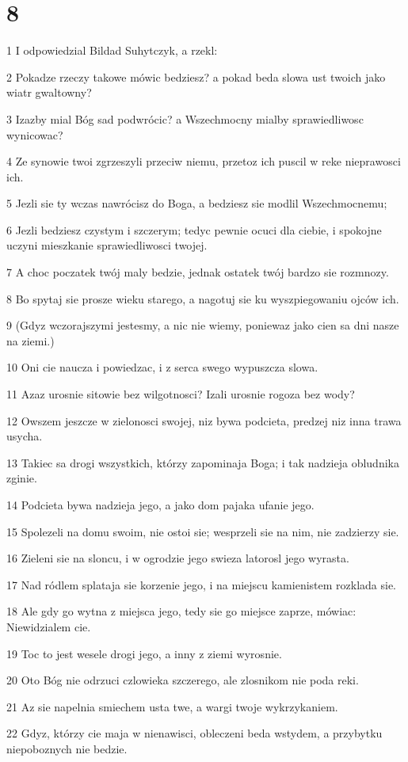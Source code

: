 \chapter{8}

\par 1 I odpowiedzial Bildad Suhytczyk, a rzekl:
\par 2 Pokadze rzeczy takowe mówic bedziesz? a pokad beda slowa ust twoich jako wiatr gwaltowny?
\par 3 Izazby mial Bóg sad podwrócic? a Wszechmocny mialby sprawiedliwosc wynicowac?
\par 4 Ze synowie twoi zgrzeszyli przeciw niemu, przetoz ich puscil w reke nieprawosci ich.
\par 5 Jezli sie ty wczas nawrócisz do Boga, a bedziesz sie modlil Wszechmocnemu;
\par 6 Jezli bedziesz czystym i szczerym; tedyc pewnie ocuci dla ciebie, i spokojne uczyni mieszkanie sprawiedliwosci twojej.
\par 7 A choc poczatek twój maly bedzie, jednak ostatek twój bardzo sie rozmnozy.
\par 8 Bo spytaj sie prosze wieku starego, a nagotuj sie ku wyszpiegowaniu ojców ich.
\par 9 (Gdyz wczorajszymi jestesmy, a nic nie wiemy, poniewaz jako cien sa dni nasze na ziemi.)
\par 10 Oni cie naucza i powiedzac, i z serca swego wypuszcza slowa.
\par 11 Azaz urosnie sitowie bez wilgotnosci? Izali urosnie rogoza bez wody?
\par 12 Owszem jeszcze w zielonosci swojej, niz bywa podcieta, predzej niz inna trawa usycha.
\par 13 Takiec sa drogi wszystkich, którzy zapominaja Boga; i tak nadzieja obludnika zginie.
\par 14 Podcieta bywa nadzieja jego, a jako dom pajaka ufanie jego.
\par 15 Spolezeli na domu swoim, nie ostoi sie; wesprzeli sie na nim, nie zadzierzy sie.
\par 16 Zieleni sie na sloncu, i w ogrodzie jego swieza latorosl jego wyrasta.
\par 17 Nad ródlem splataja sie korzenie jego, i na miejscu kamienistem rozklada sie.
\par 18 Ale gdy go wytna z miejsca jego, tedy sie go miejsce zaprze, mówiac: Niewidzialem cie.
\par 19 Toc to jest wesele drogi jego, a inny z ziemi wyrosnie.
\par 20 Oto Bóg nie odrzuci czlowieka szczerego, ale zlosnikom nie poda reki.
\par 21 Az sie napelnia smiechem usta twe, a wargi twoje wykrzykaniem.
\par 22 Gdyz, którzy cie maja w nienawisci, obleczeni beda wstydem, a przybytku niepoboznych nie bedzie.

